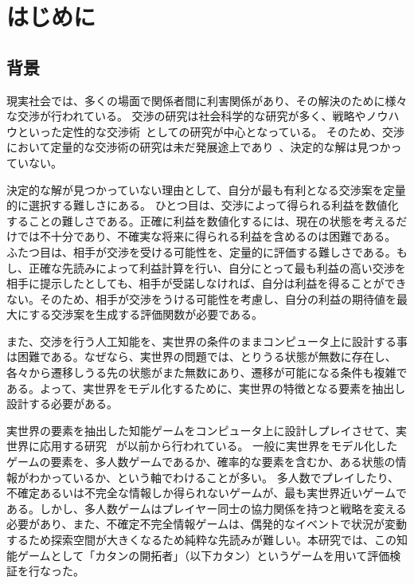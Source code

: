 \documentclass[a4, 10pt,dvipdfmx]{jsarticle}
\begin{document}
\section{はじめに}

\subsection{背景}

現実社会では、多くの場面で関係者間に利害関係があり、その解決のために様々な交渉が行われている。
交渉の研究は社会科学的な研究が多く、戦略やノウハウといった定性的な交渉術~\cite{fisher2011,lewicki2001essentials,岡紀子2002視点}としての研究が中心となっている。
そのため、交渉において定量的な交渉術の研究は未だ発展途上であり~\cite{安村禎明2002モノポリーゲームにおける交渉エージェント}、決定的な解は見つかっていない。

決定的な解が見つかっていない理由として、自分が最も有利となる交渉案を定量的に選択する難しさにある。
ひとつ目は、交渉によって得られる利益を数値化することの難しさである。正確に利益を数値化するには、現在の状態を考えるだけでは不十分であり、不確実な将来に得られる利益を含めるのは困難である。
ふたつ目は、相手が交渉を受ける可能性を、定量的に評価する難しさである。もし、正確な先読みによって利益計算を行い、自分にとって最も利益の高い交渉を相手に提示したとしても、相手が受諾しなければ、自分は利益を得ることができない。そのため、相手が交渉をうける可能性を考慮し、自分の利益の期待値を最大にする交渉案を生成する評価関数が必要である。

また、交渉を行う人工知能を、実世界の条件のままコンピュータ上に設計する事は困難である。なぜなら、実世界の問題では、とりうる状態が無数に存在し、各々から遷移しうる先の状態がまた無数にあり、遷移が可能になる条件も複雑である。よって、実世界をモデル化するために、実世界の特徴となる要素を抽出し設計する必要がある。

実世界の要素を抽出した知能ゲームをコンピュータ上に設計しプレイさせて、実世界に応用する研究 ~\cite{川越敏司2010行動ゲーム理論入門}が以前から行われている。
一般に実世界をモデル化したゲームの要素を、多人数ゲームであるか、確率的な要素を含むか、ある状態の情報がわかっているか、という軸でわけることが多い。
多人数でプレイしたり、不確定あるいは不完全な情報しか得られないゲームが、最も実世界近いゲームである。しかし、多人数ゲームはプレイヤー同士の協力関係を持つと戦略を変える必要があり、また、不確定不完全情報ゲームは、偶発的なイベントで状況が変動するため探索空間が大きくなるため純粋な先読みが難しい。本研究では、この知能ゲームとして「カタンの開拓者」（以下カタン）というゲームを用いて評価検証を行なった。
\end{document}
